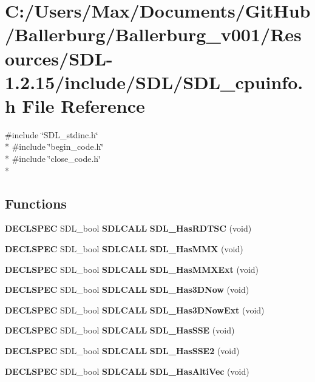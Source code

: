 \section{C\+:/\+Users/\+Max/\+Documents/\+Git\+Hub/\+Ballerburg/\+Ballerburg\+\_\+v001/\+Resources/\+S\+D\+L-\/1.2.15/include/\+S\+D\+L/\+S\+D\+L\+\_\+cpuinfo.h File Reference}
\label{_s_d_l__cpuinfo_8h}
{\ttfamily \#include \char`\"{}S\+D\+L\+\_\+stdinc.\+h\char`\"{}}\\*
{\ttfamily \#include \char`\"{}begin\+\_\+code.\+h\char`\"{}}\\*
{\ttfamily \#include \char`\"{}close\+\_\+code.\+h\char`\"{}}\\*
\subsection*{Functions}
\begin{DoxyCompactItemize}
\item 
{\bf D\+E\+C\+L\+S\+P\+E\+C} S\+D\+L\+\_\+bool {\bf S\+D\+L\+C\+A\+L\+L} {\bf S\+D\+L\+\_\+\+Has\+R\+D\+T\+S\+C} (void)
\item 
{\bf D\+E\+C\+L\+S\+P\+E\+C} S\+D\+L\+\_\+bool {\bf S\+D\+L\+C\+A\+L\+L} {\bf S\+D\+L\+\_\+\+Has\+M\+M\+X} (void)
\item 
{\bf D\+E\+C\+L\+S\+P\+E\+C} S\+D\+L\+\_\+bool {\bf S\+D\+L\+C\+A\+L\+L} {\bf S\+D\+L\+\_\+\+Has\+M\+M\+X\+Ext} (void)
\item 
{\bf D\+E\+C\+L\+S\+P\+E\+C} S\+D\+L\+\_\+bool {\bf S\+D\+L\+C\+A\+L\+L} {\bf S\+D\+L\+\_\+\+Has3\+D\+Now} (void)
\item 
{\bf D\+E\+C\+L\+S\+P\+E\+C} S\+D\+L\+\_\+bool {\bf S\+D\+L\+C\+A\+L\+L} {\bf S\+D\+L\+\_\+\+Has3\+D\+Now\+Ext} (void)
\item 
{\bf D\+E\+C\+L\+S\+P\+E\+C} S\+D\+L\+\_\+bool {\bf S\+D\+L\+C\+A\+L\+L} {\bf S\+D\+L\+\_\+\+Has\+S\+S\+E} (void)
\item 
{\bf D\+E\+C\+L\+S\+P\+E\+C} S\+D\+L\+\_\+bool {\bf S\+D\+L\+C\+A\+L\+L} {\bf S\+D\+L\+\_\+\+Has\+S\+S\+E2} (void)
\item 
{\bf D\+E\+C\+L\+S\+P\+E\+C} S\+D\+L\+\_\+bool {\bf S\+D\+L\+C\+A\+L\+L} {\bf S\+D\+L\+\_\+\+Has\+Alti\+Vec} (void)
\end{DoxyCompactItemize}


